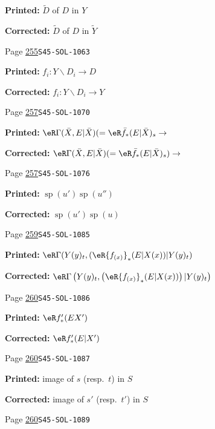 \documentclass[oneside]{book}
\DeclareMathOperator{\spe}{sp} %
\renewcommand{\setminus}{\smallsetminus}
\theoremstyle{sga-source}
\theoremstyle{sga-source-dash}
\theoremstyle{sga-source-dotdash}
\theoremstyle{sga-source-number-note-dash}
\theoremstyle{sga-source-note-number-dotdash}
\theoremstyle{sga-source-example-dotdash}
\theoremstyle{sga-source-inline-number}
\theoremstyle{sga-source-bare-number}
\theoremstyle{sga-source}
\begin{document}
\begin{description}
\par\noindent\textbf{Printed:} $\widetilde D$ of $D$ in $Y$
\par\noindent\textbf{Corrected:} $\widetilde D$ of $D$ in $\widetilde Y$
\smallskip
\item[\hypertarget{apparatus:EN-0182}{182}] Page \hyperlink{printpage:en:255}{255}\quad\texttt{S45-SOL-1063}
\par\noindent\textbf{Printed:} \(f_i:Y\setminus D_i \to D\)
\par\noindent\textbf{Corrected:} \(f_i:Y\setminus D_i \to Y\)
\smallskip
\item[\hypertarget{apparatus:EN-0183}{183}] Page \hyperlink{printpage:en:257}{257}\quad\texttt{S45-SOL-1070}
\par\noindent\textbf{Printed:} \(\eR\Gamma(\bar X,E|\bar X) (=\eR\bar f_\ast (E|\bar X)_s \to\)
\par\noindent\textbf{Corrected:} \(\eR\Gamma(\bar X,E|\bar X) (=\eR\bar f_\ast (E|\bar X)_s) \to\)
\smallskip
\item[\hypertarget{apparatus:EN-0184}{184}] Page \hyperlink{printpage:en:257}{257}\quad\texttt{S45-SOL-1076}
\par\noindent\textbf{Printed:} \(\spe(u')\spe(u'')\)
\par\noindent\textbf{Corrected:} \(\spe(u')\spe(u)\)
\smallskip
\item[\hypertarget{apparatus:EN-0185}{185}] Page \hyperlink{printpage:en:259}{259}\quad\texttt{S45-SOL-1085}
\par\noindent\textbf{Printed:} \(\eR\Gamma(Y(y)_t,(\eR {f_{(x)}}_\ast (E|X(x))|Y(y)_t)\)
\par\noindent\textbf{Corrected:} \(\eR\Gamma\left(Y(y)_t,\left(\eR {f_{(x)}}_\ast (E|X(x))\right)|Y(y)_t\right)\)
\smallskip
\item[\hypertarget{apparatus:EN-0186}{186}] Page \hyperlink{printpage:en:260}{260}\quad\texttt{S45-SOL-1086}
\par\noindent\textbf{Printed:} \(\eR f'_\ast(E X')\)
\par\noindent\textbf{Corrected:} \(\eR f'_\ast(E|X')\)
\smallskip
\item[\hypertarget{apparatus:EN-0187}{187}] Page \hyperlink{printpage:en:260}{260}\quad\texttt{S45-SOL-1087}
\par\noindent\textbf{Printed:} image of
$s$ (resp.\ $t$) in $S$
\par\noindent\textbf{Corrected:} image of
$s'$ (resp.\ $t'$) in $S$
\smallskip
\item[\hypertarget{apparatus:EN-0188}{188}] Page \hyperlink{printpage:en:260}{260}\quad\texttt{S45-SOL-1089}

\end{description}
\end{document}
